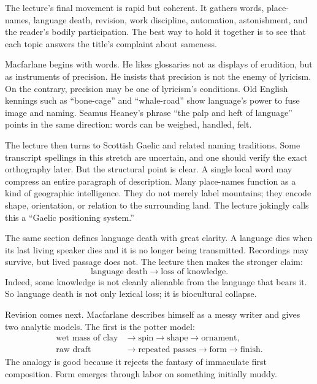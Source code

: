 The lecture's final movement is rapid but coherent. It gathers words, place-names, language death, revision, work discipline, automation, astonishment, and the reader's bodily participation. The best way to hold it together is to see that each topic answers the title's complaint about sameness.

Macfarlane begins with words. He likes glossaries not as displays of erudition, but as instruments of precision. He insists that precision is not the enemy of lyricism. On the contrary, precision may be one of lyricism's conditions. Old English kennings such as ``bone-cage'' and ``whale-road'' show language's power to fuse image and naming. Seamus Heaney's phrase ``the palp and heft of language'' points in the same direction: words can be weighed, handled, felt.

The lecture then turns to Scottish Gaelic and related naming traditions. Some transcript spellings in this stretch are uncertain, and one should verify the exact orthography later. But the structural point is clear. A single local word may compress an entire paragraph of description. Many place-names function as a kind of geographic intelligence. They do not merely label mountains; they encode shape, orientation, or relation to the surrounding land. The lecture jokingly calls this a ``Gaelic positioning system.''

The same section defines language death with great clarity. A language dies when its last living speaker dies and it is no longer being transmitted. Recordings may survive, but lived passage does not. The lecture then makes the stronger claim:
\begin{equation}
\text{language death} \longrightarrow \text{loss of knowledge}.
\end{equation}
Indeed, some knowledge is not cleanly alienable from the language that bears it. So language death is not only lexical loss; it is biocultural collapse.

Revision comes next. Macfarlane describes himself as a messy writer and gives two analytic models. The first is the potter model:
\begin{align}
\text{wet mass of clay} &\longrightarrow \text{spin} \longrightarrow \text{shape} \longrightarrow \text{ornament},\\
\text{raw draft} &\longrightarrow \text{repeated passes} \longrightarrow \text{form} \longrightarrow \text{finish}.
\end{align}
The analogy is good because it rejects the fantasy of immaculate first composition. Form emerges through labor on something initially muddy.

